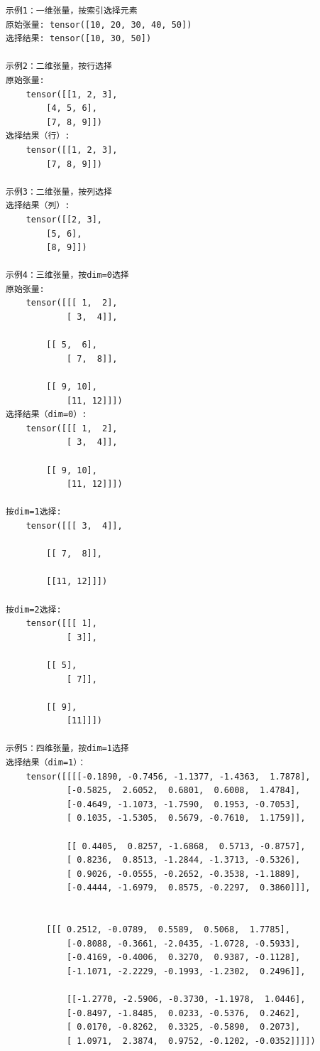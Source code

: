 \begin{lstlisting}[style=demostyle,numbers=none]
示例1：一维张量，按索引选择元素
原始张量: tensor([10, 20, 30, 40, 50])
选择结果: tensor([10, 30, 50])

示例2：二维张量，按行选择
原始张量:
    tensor([[1, 2, 3],
        [4, 5, 6],
        [7, 8, 9]])
选择结果（行）:
    tensor([[1, 2, 3],
        [7, 8, 9]])

示例3：二维张量，按列选择
选择结果（列）:
    tensor([[2, 3],
        [5, 6],
        [8, 9]])

示例4：三维张量，按dim=0选择
原始张量:
    tensor([[[ 1,  2],
            [ 3,  4]],

        [[ 5,  6],
            [ 7,  8]],

        [[ 9, 10],
            [11, 12]]])
选择结果（dim=0）:
    tensor([[[ 1,  2],
            [ 3,  4]],

        [[ 9, 10],
            [11, 12]]])

按dim=1选择:
    tensor([[[ 3,  4]],

        [[ 7,  8]],

        [[11, 12]]])

按dim=2选择:
    tensor([[[ 1],
            [ 3]],

        [[ 5],
            [ 7]],

        [[ 9],
            [11]]])

示例5：四维张量，按dim=1选择
选择结果（dim=1）：
    tensor([[[[-0.1890, -0.7456, -1.1377, -1.4363,  1.7878],
            [-0.5825,  2.6052,  0.6801,  0.6008,  1.4784],
            [-0.4649, -1.1073, -1.7590,  0.1953, -0.7053],
            [ 0.1035, -1.5305,  0.5679, -0.7610,  1.1759]],

            [[ 0.4405,  0.8257, -1.6868,  0.5713, -0.8757],
            [ 0.8236,  0.8513, -1.2844, -1.3713, -0.5326],
            [ 0.9026, -0.0555, -0.2652, -0.3538, -1.1889],
            [-0.4444, -1.6979,  0.8575, -0.2297,  0.3860]]],


        [[[ 0.2512, -0.0789,  0.5589,  0.5068,  1.7785],
            [-0.8088, -0.3661, -2.0435, -1.0728, -0.5933],
            [-0.4169, -0.4006,  0.3270,  0.9387, -0.1128],
            [-1.1071, -2.2229, -0.1993, -1.2302,  0.2496]],

            [[-1.2770, -2.5906, -0.3730, -1.1978,  1.0446],
            [-0.8497, -1.8485,  0.0233, -0.5376,  0.2462],
            [ 0.0170, -0.8262,  0.3325, -0.5890,  0.2073],
            [ 1.0971,  2.3874,  0.9752, -0.1202, -0.0352]]]])
\end{lstlisting}


